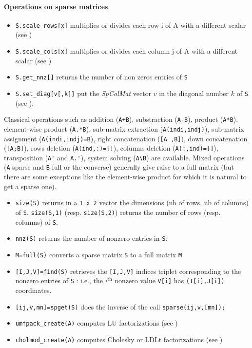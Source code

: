\paragraph{Operations on sparse matrices}
\begin{itemize}
\item \verb+S.scale_rows[x]+ multiplies or divides each row i of A with a different scalar (see ) 
\item \verb+S.scale_cols[x]+ multiplies or divides each column j of A with a different scalar (see )
\item \verb+S.get_nnz[]+ returns the number of non zeros entries of \verb+S+ 
\item \verb+S.set_diag[v[,k]]+ put the \emph{SpColMat} vector $v$ in the diagonal number $k$ of \verb+S+
 (see ).

\end{itemize}


Classical operations such as addition (\verb-A+B-), substraction  (\verb+A-B+), product (\verb+A*B+), 
element-wise product (\verb+A.*B+), sub-matrix extraction (\verb+A(indi,indj)+), 
sub-matrix assignment (\verb+A(indi,indj)=B+), right concatenation  (\verb+[A ,B]+), 
down concatenation  (\verb+[A;B]+),  rows deletion (\verb+A(ind,:)=[]+), columns deletion (\verb+A(:,ind)=[]+), 
transposition (\verb+A'+ and \verb+A.'+),  system solving (\verb+A\B+) are available. 
Mixed operations (\verb+A+ sparse and \verb+B+ full or the converse) generally give raise to a 
full matrix (but there are some exceptions like the element-wise product for which it is natural 
to get a sparse one). 

\begin{itemize}
   \item \verb+size(S)+ returns in a \verb+1 x 2+ vector the dimensions (nb of rows, nb of columns)
of \verb+S+. \verb+size(S,1)+ (resp. \verb+size(S,2)+) returns the number of rows 
(resp. columns) of \verb+S+.
    \item \verb+nnz(S)+ returns the number of nonzero entries in \verb+S+.
    \item \verb+M=full(S)+ converts a sparse matrix \verb+S+ to a full matrix \verb+M+ 
    \item \verb+[I,J,V]=find(S)+ retrieves the \verb+[I,J,V]+ indices triplet 
corresponding to the nonzero entries of \verb+S+ : i.e., the $i^{\mbox{th}}$ nonzero
value \verb+V[i]+ has \verb+(I[i],J[i])+ coordinates.
    \item \verb+[ij,v,mn]=spget(S)+ does the inverse of the call \verb+sparse(ij,v,[mn]);+ 
    \item \verb+umfpack_create(A)+ computes LU factorizations (see )
    \item \verb+cholmod_create(A)+ computes Cholesky or LDLt factorizations (see
      )
\end{itemize}

